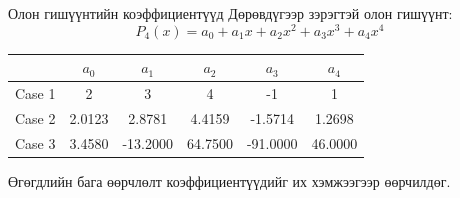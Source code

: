 \documentclass[dvipsnames]{beamer}
\begin{document}
\begin{frame}{Олон гишүүнтийн коэффициентүүд}
\small
Дөрөвдүгээр зэрэгтэй олон гишүүнт:
\[
P_4(x)=a_0 + a_1 x + a_2 x^2 + a_3 x^3 + a_4 x^4
\]

\vspace{0.3cm}
\centering
\begin{tabular}{c|ccccc}
 & $a_0$ & $a_1$ & $a_2$ & $a_3$ & $a_4$ \\
\hline
Case 1 & 2 & 3 & 4 & -1 & 1 \\
Case 2 & 2.0123 & 2.8781 & 4.4159 & -1.5714 & 1.2698 \\
Case 3 & 3.4580 & -13.2000 & 64.7500 & -91.0000 & 46.0000
\end{tabular}

\vspace{0.3cm}
\footnotesize
Өгөгдлийн бага өөрчлөлт коэффициентүүдийг их хэмжээгээр өөрчилдөг.
\end{frame}
\end{document}
